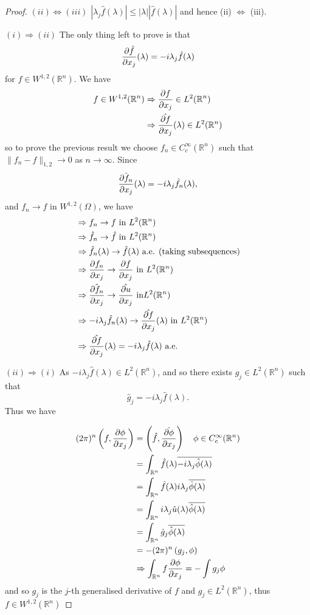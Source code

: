 \documentclass[10pt, oneside, reqno]{amsart}
\theoremstyle{plain}%
\numberwithin{equation}{section}
\theoremstyle{definition}
\theoremstyle{remark}
\newcommand{\R}{\mathbb{R}}
\begin{document}
\begin{proof}
	$(ii) \iff (iii)$ $|\lambda_j \hat f(\lambda) | \leq |\lambda | | \hat f(\lambda)|$ and hence (ii) $\iff$ (iii).  
	
	$(i) \Rightarrow (ii)$  The only thing left to prove is that \[
		\frac{\partial \hat f}{\partial x_j}(\lambda) = -i \lambda_j \hat f(\lambda) 
	\] for $f \in W^{1, 2}(\R^n)$.  We have \begin{align*}
		f \in W^{1, 2}(\R^n) &\Rightarrow \parder{f}{x_j} \in L^2(\R^n) \\
			&\Rightarrow \hat{\parder{f}{x_j}}(\lambda) \in L^2(\R^n)
	\end{align*} so to prove the previous result we choose $f_n \in C^\infty_c(\R^n)$ such that $\| f_n - f\|_{1, 2} \rightarrow 0$ as $n \rightarrow \infty$.  Since \[
		\hat{\frac{\partial f_n}{\partial x_j}}(\lambda) = -i \lambda_j \hat f_n (\lambda),
	\] and $f_n \rightarrow f$ in $W^{1, 2}(\Omega)$, we have \begin{align*}
		&\Rightarrow f_n \rightarrow f \text{ in } L^2(\R^n) \\
		&\Rightarrow \hat f_n \rightarrow \hat f \text{ in } L^2(\R^n) \\
		&\Rightarrow \hat f_n(\lambda) \rightarrow \hat f(\lambda) \text{ a.e. (taking subsequences)} \\
		&\Rightarrow \parder{f_n}{x_j} \rightarrow \parder{f}{x_j} \text{ in } L^2(\R^n) \\
		&\Rightarrow \hat{\parder{f_n}{x_j}} \rightarrow \hat{\parder{u}{x_j}} \text{ in} L^2(\R^n) \\
		&\Rightarrow -i \lambda_j \hat f_n(\lambda) \rightarrow \hat{\parder{f}{x_j}}(\lambda) \text{ in } L^2(\R^n) \\
		&\Rightarrow \hat{\parder{f}{x_j}}(\lambda) = -i \lambda_j \hat f(\lambda) \text{ a.e.}
	\end{align*} 
	
	$(ii) \Rightarrow (i)$ As $-i \lambda_j \hat f(\lambda) \in L^2(\R^n)$, and so there exists $g_j \in L^2(\R^n)$ such that \[
		\hat g_j = -i \lambda_j \hat f(\lambda).
	\]  Thus we have 
	
	\begin{align*}
		(2\pi)^n \left(f, \parder{\phi}{x_j} \right) &=  \left(\hat f, \hat{ \parder{\phi}{x_j}} \right) \quad \phi \in C^\infty_c(\R^n)\\
		&= \int_{\R^n} \hat f(\lambda) \overline{-i \lambda_j \hat \phi(\lambda)} \\
		&= \int_{\R^n} \hat f(\lambda) i \lambda_j \overline{\hat \phi(\lambda)} \\
		&= \int_{\R^n} i \lambda_j \hat u(\lambda) \overline{\hat \phi(\lambda)} \\
		&= \int_{\R^n} \hat g_j \overline{\hat \phi(\lambda)} \\
		&= -(2\pi)^n \left(g_j, \phi \right) \\
		&\Rightarrow \int_{\R^n} f \parder{\phi}{x_j} = -\int g_j \phi
	\end{align*} and so $g_j$ is the $j$-th generalised derivative of $f$ and $g_j \in L^2(\R^n)$, thus $f \in W^{1, 2}(\R^n)$   
\end{proof}
\end{document}
